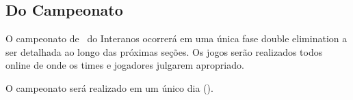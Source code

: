 \subsection{Do Campeonato}

O campeonato de \Modality\ do Interanos ocorrerá em uma única fase double elimination a ser detalhada ao longo das próximas seções. Os jogos serão realizados todos online de onde os times e jogadores julgarem apropriado.

O campeonato será realizado em um único dia (\FullDate).